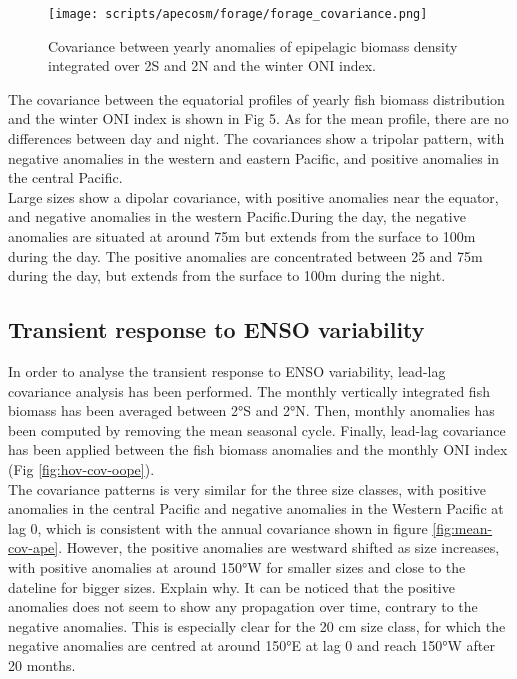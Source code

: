 \begin{figure}[h!]
    \centering
    \texttt{[image: scripts/apecosm/forage/forage\_covariance.png]}
	\caption{Covariance between yearly anomalies of epipelagic biomass density integrated over 2\degree S and 2\degree N and the winter ONI index.}
    \label{fig:covariance-forage}
\end{figure}

The covariance between the equatorial profiles of yearly fish biomass distribution and the winter ONI index is shown in Fig 5. As for the mean profile, there are no differences between day and night. The covariances show a tripolar pattern, with negative anomalies in the western and eastern Pacific, and positive anomalies in the central Pacific.\\

Large sizes show a dipolar covariance, with positive anomalies near the equator, and negative anomalies in the western Pacific.During the day, the negative anomalies are situated at around 75m but extends from the surface to 100m during the day. The positive anomalies are concentrated between 25 and 75m during the day, but extends from the surface to 100m during the night.\\

\subsection{Transient response to ENSO variability}

In order to analyse the transient response to ENSO variability, lead-lag covariance analysis has been performed. The monthly vertically integrated fish biomass has been averaged between 2°S and 2°N. Then, monthly anomalies has been computed by removing the mean seasonal cycle. Finally, lead-lag covariance has been applied between the fish biomass anomalies and the monthly ONI index (Fig \ref{fig:hov-cov-oope}).\\

The covariance patterns is very similar for the three size classes, with positive anomalies in the central Pacific and negative anomalies in the Western Pacific at lag 0, which is consistent with the annual covariance shown in figure \ref{fig:mean-cov-ape}. However, the positive anomalies are westward shifted as size increases, with positive anomalies at around 150°W for smaller sizes and close to the dateline for bigger sizes. Explain why. It can be noticed that the positive anomalies does not seem to show any propagation over time, contrary to the negative anomalies. This is especially clear for the 20 cm size class, for which the negative anomalies are centred at around 150°E at lag 0 and reach 150°W after 20 months.\\

